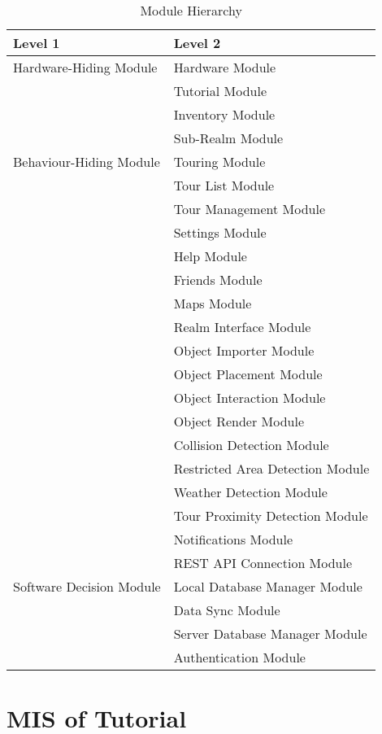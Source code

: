 \documentclass[12pt, titlepage]{article}
\begin{document}
\begin{table}[h!]
\centering
\begin{tabular}{p{} p{}}
\toprule
\textbf{Level 1} & \textbf{Level 2}\\
\midrule

{Hardware-Hiding Module} & Hardware Module\\
\midrule

\multirow{7}{0.3\textwidth}{Behaviour-Hiding Module} & Tutorial Module\\
& Inventory Module\\
& Sub-Realm Module\\
& Touring Module\\
& Tour List Module\\
& Tour Management Module\\
& Settings Module\\
& Help Module\\
& Friends Module\\
& Maps Module\\
& Realm Interface Module\\
& Object Importer Module\\
& Object Placement Module\\
& Object Interaction Module\\
& Object Render Module\\
& Collision Detection Module\\
& Restricted Area Detection Module\\
& Weather Detection Module\\
& Tour Proximity Detection Module\\
& Notifications Module\\
\midrule

\multirow{3}{0.3\textwidth}{Software Decision Module} & REST API Connection Module\\
& Local Database Manager Module\\
& Data Sync Module\\
& Server Database Manager Module\\
& Authentication Module\\
\bottomrule

\end{tabular}
\caption{Module Hierarchy}
\label{TblMH}
\end{table}

\newpage

\section{MIS of Tutorial} \label{Tutorial}
\end{document}
